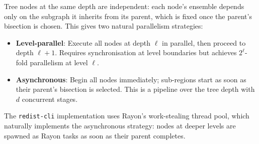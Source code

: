 Tree nodes at the same depth are independent: each node's ensemble depends
only on the subgraph it inherits from its parent, which is fixed once the
parent's bisection is chosen. This gives two natural parallelism strategies:
\begin{itemize}
  \item \textbf{Level-parallel}: Execute all nodes at depth $\ell$ in parallel,
        then proceed to depth $\ell + 1$. Requires synchronisation at level
        boundaries but achieves $2^\ell$-fold parallelism at level $\ell$.
  \item \textbf{Asynchronous}: Begin all nodes immediately; sub-regions start
        as soon as their parent's bisection is selected. This is a pipeline
        over the tree depth with $d$ concurrent stages.
\end{itemize}
The \texttt{redist-cli} implementation uses Rayon's work-stealing thread pool,
which naturally implements the asynchronous strategy: nodes at deeper levels
are spawned as Rayon tasks as soon as their parent completes.
